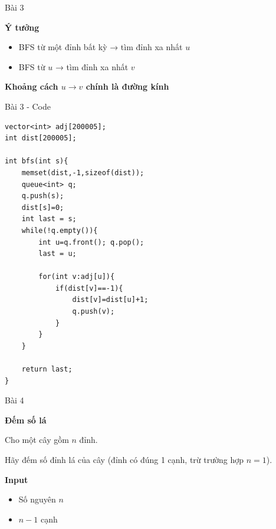 \begin{frame}{Bài 3}

\textbf{Ý tưởng}

\vspace{0.4cm}

\begin{itemize}
\item BFS từ một đỉnh bất kỳ → tìm đỉnh xa nhất $u$
\item BFS từ $u$ → tìm đỉnh xa nhất $v$
\end{itemize}

\vspace{0.3cm}

\textbf{Khoảng cách $u \rightarrow v$ chính là đường kính}

\end{frame}
\begin{frame}[fragile]{Bài 3 - Code}

\begin{lstlisting}
vector<int> adj[200005];
int dist[200005];

int bfs(int s){
    memset(dist,-1,sizeof(dist));
    queue<int> q;
    q.push(s);
    dist[s]=0;
    int last = s;
    while(!q.empty()){
        int u=q.front(); q.pop();
        last = u;

        for(int v:adj[u]){
            if(dist[v]==-1){
                dist[v]=dist[u]+1;
                q.push(v);
            }
        }
    }

    return last;
}
\end{lstlisting}

\end{frame}

\begin{frame}{Bài 4}

\begin{center}
\textbf{Đếm số lá}
\end{center}

{\small
Cho một cây gồm $n$ đỉnh.

Hãy đếm số đỉnh lá của cây (đỉnh có đúng 1 cạnh, trừ trường hợp $n=1$).
}

\vspace{0.3cm}

\textbf{Input}
\begin{itemize}
\item Số nguyên $n$
\item $n-1$ cạnh
\end{itemize}

\end{frame}

